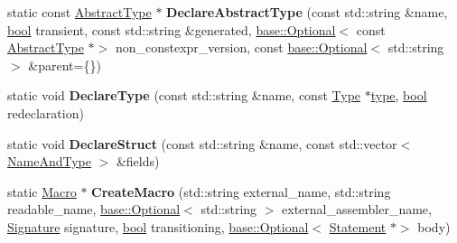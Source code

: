 \begin{DoxyCompactItemize}
\mbox{\label{classv8_1_1internal_1_1torque_1_1Declarations_a4d28f77d3ab3b568f0e35695807989ec}} 
static const \mbox{\hyperlink{classv8_1_1internal_1_1torque_1_1AbstractType}{Abstract\+Type}} $\ast$ {\bfseries Declare\+Abstract\+Type} (const std\+::string \&name, \mbox{\hyperlink{classbool}{bool}} transient, const std\+::string \&generated, \mbox{\hyperlink{classv8_1_1base_1_1Optional}{base\+::\+Optional}}$<$ const \mbox{\hyperlink{classv8_1_1internal_1_1torque_1_1AbstractType}{Abstract\+Type}} $\ast$$>$ non\+\_\+constexpr\+\_\+version, const \mbox{\hyperlink{classv8_1_1base_1_1Optional}{base\+::\+Optional}}$<$ std\+::string $>$ \&parent=\{\})
\item 
\mbox{\label{classv8_1_1internal_1_1torque_1_1Declarations_a7faf1f6891be822c91571f9dc3ac7ea0}} 
static void {\bfseries Declare\+Type} (const std\+::string \&name, const \mbox{\hyperlink{classv8_1_1internal_1_1torque_1_1Type}{Type}} $\ast$\mbox{\hyperlink{classstd_1_1conditional_1_1type}{type}}, \mbox{\hyperlink{classbool}{bool}} redeclaration)
\item 
\mbox{\label{classv8_1_1internal_1_1torque_1_1Declarations_ac18b5dc8065fe45f368272566c32c00d}} 
static void {\bfseries Declare\+Struct} (const std\+::string \&name, const std\+::vector$<$ \mbox{\hyperlink{structv8_1_1internal_1_1torque_1_1NameAndType}{Name\+And\+Type}} $>$ \&fields)
\item 
\mbox{\label{classv8_1_1internal_1_1torque_1_1Declarations_a9a5609985daf617a42a80edd709860a6}} 
static \mbox{\hyperlink{classv8_1_1internal_1_1torque_1_1Macro}{Macro}} $\ast$ {\bfseries Create\+Macro} (std\+::string external\+\_\+name, std\+::string readable\+\_\+name, \mbox{\hyperlink{classv8_1_1base_1_1Optional}{base\+::\+Optional}}$<$ std\+::string $>$ external\+\_\+assembler\+\_\+name, \mbox{\hyperlink{structv8_1_1internal_1_1torque_1_1Signature}{Signature}} signature, \mbox{\hyperlink{classbool}{bool}} transitioning, \mbox{\hyperlink{classv8_1_1base_1_1Optional}{base\+::\+Optional}}$<$ \mbox{\hyperlink{structv8_1_1internal_1_1torque_1_1Statement}{Statement}} $\ast$$>$ body)
\item 
\mbox{\label{classv8_1_1internal_1_1torque_1_1Declarations_a9143ebc1a0c4bf780d8e1a37c2c22c7c}} 

\end{DoxyCompactItemize}
